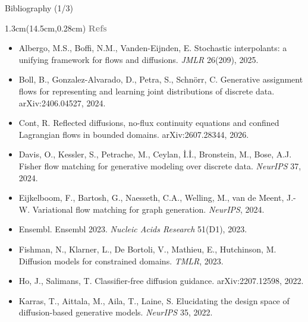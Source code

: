 \documentclass[aspectratio=169,10pt]{beamer}
\newcommand{\lab}[1]{%
  \begin{textblock*}{1.3cm}(14.5cm,0.28cm)
    \raggedleft\bfseries\small\textcolor{gray}{#1}
  \end{textblock*}}
\begin{document}
\begin{frame}{Bibliography (1/3)}
\lab{Refs}
\footnotesize
\begin{itemize}\itemsep1pt
\item Albergo, M.S., Boffi, N.M., Vanden-Eijnden, E. Stochastic interpolants: a unifying
framework for flows and diffusions. \emph{JMLR} 26(209), 2025.
\item Boll, B., Gonzalez-Alvarado, D., Petra, S., Schn\"orr, C. Generative assignment flows for
representing and learning joint distributions of discrete data. arXiv:2406.04527, 2024.
\item Cont, R. Reflected diffusions, no-flux continuity equations and confined Lagrangian flows
in bounded domains. arXiv:2607.28344, 2026.
\item Davis, O., Kessler, S., Petrache, M., Ceylan, \.I.\.I., Bronstein, M., Bose, A.J. Fisher
flow matching for generative modeling over discrete data. \emph{NeurIPS} 37, 2024.
\item Eijkelboom, F., Bartosh, G., Naesseth, C.A., Welling, M., van de Meent, J.-W. Variational
flow matching for graph generation. \emph{NeurIPS}, 2024.
\item Ensembl. Ensembl 2023. \emph{Nucleic Acids Research} 51(D1), 2023.
\item Fishman, N., Klarner, L., De Bortoli, V., Mathieu, E., Hutchinson, M. Diffusion models for
constrained domains. \emph{TMLR}, 2023.
\item Ho, J., Salimans, T. Classifier-free diffusion guidance. arXiv:2207.12598, 2022.
\item Karras, T., Aittala, M., Aila, T., Laine, S. Elucidating the design space of
diffusion-based generative models. \emph{NeurIPS} 35, 2022.
\end{itemize}
\end{frame}
\end{document}
